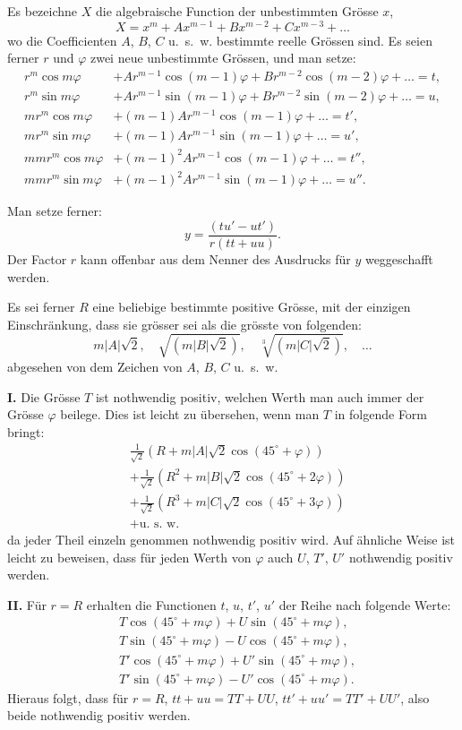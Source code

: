 \documentclass[12pt,a4paper]{article}
\newcommand{\1}{\ensuremath{\mathrlap{\,|\,}}} %
\begin{document}
Es bezeichne $X$ die algebraische Function der unbestimmten Grösse $x$,
\[X = x^m + Ax^{m-1} + Bx^{m-2} + Cx^{m-3} + \ldots\]
wo die Coefficienten $A$, $B$, $C$ u.~s.~w. bestimmte reelle Grössen sind. Es seien ferner $r$ und $\varphi$ zwei neue unbestimmte Grössen, und man setze:
\begin{align*}
r^m\cos m\varphi &+ Ar^{m-1}\cos(m-1)\varphi + Br^{m-2}\cos(m-2)\varphi + \ldots = t,\\
r^m\sin m\varphi &+ Ar^{m-1}\sin(m-1)\varphi + Br^{m-2}\sin(m-2)\varphi + \ldots = u,\\
mr^{m}\cos m\varphi &+ (m-1)Ar^{m-1}\cos(m-1)\varphi + \ldots = t',\\
mr^{m}\sin m\varphi &+ (m-1)Ar^{m-1}\sin(m-1)\varphi + \ldots = u',\\
mmr^m\cos m\varphi &+ (m-1)^2Ar^{m-1}\cos(m-1)\varphi + \ldots = t'',\\
mmr^m\sin m\varphi &+ (m-1)^2Ar^{m-1}\sin(m-1)\varphi + \ldots = u''.
\end{align*}

Man setze ferner:
\[y = \frac{(tu'-ut')}{r(tt+uu)}.\]
Der Factor $r$ kann offenbar aus dem Nenner des Ausdrucks für $y$ weggeschafft werden.

Es sei ferner $R$ eine beliebige bestimmte positive Grösse, mit der einzigen Einschränkung, dass sie grösser sei als die grösste von folgenden:
\[m|A|\sqrt{2},\quad \sqrt{(m|B|\sqrt{2})},\quad \sqrt[3]{(m|C|\sqrt{2})},\quad \ldots\]
abgesehen von dem Zeichen von $A$, $B$, $C$ u.~s.~w.

\textbf{I.} Die Grösse $T$ ist nothwendig positiv, welchen Werth man auch immer der Grösse $\varphi$ beilege. Dies ist leicht zu übersehen, wenn man $T$ in folgende Form bringt:
\begin{align*}
&\frac{1}{\sqrt{2}}(R + m|A|\sqrt{2}\cos(45^{\circ}+\varphi))\\
&+ \frac{1}{\sqrt{2}}(R^2 + m|B|\sqrt{2}\cos(45^{\circ}+2\varphi))\\
&+ \frac{1}{\sqrt{2}}(R^3 + m|C|\sqrt{2}\cos(45^{\circ}+3\varphi))\\
&+ \text{u.~s.~w.}
\end{align*}
da jeder Theil einzeln genommen nothwendig positiv wird. Auf ähnliche Weise ist leicht zu beweisen, dass für jeden Werth von $\varphi$ auch $U$, $T'$, $U'$ nothwendig positiv werden.

\textbf{II.} Für $r = R$ erhalten die Functionen $t$, $u$, $t'$, $u'$ der Reihe nach folgende Werte:
\begin{align*}
&T\cos(45^{\circ}+m\varphi) + U\sin(45^{\circ}+m\varphi),\\
&T\sin(45^{\circ}+m\varphi) - U\cos(45^{\circ}+m\varphi),\\
&T'\cos(45^{\circ}+m\varphi) + U'\sin(45^{\circ}+m\varphi),\\
&T'\sin(45^{\circ}+m\varphi) - U'\cos(45^{\circ}+m\varphi).
\end{align*}
Hieraus folgt, dass für $r=R$, $tt+uu = TT+UU$, $tt'+uu' = TT'+UU'$, also beide nothwendig positiv werden.
\end{document}
